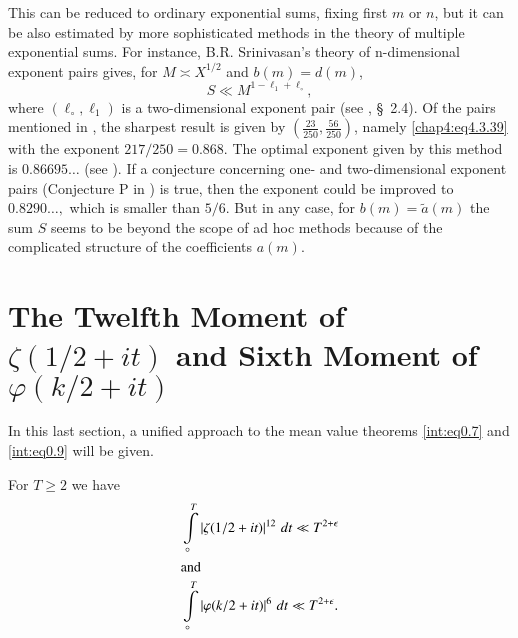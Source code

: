 This can be reduced to ordinary exponential sums, fixing first $m$ or
$n$, but it can be also estimated by more sophisticated methods in the
theory of multiple exponential sums. For instance, B.R. Srinivasan's
theory of n-dimensional exponent pairs gives, for $M\asymp X^{1/2}$
and $b(m)=d(m)$, 
\begin{equation}\label{chap4:eq4.3.39}
S\ll M^{1-\ell_1+\ell_\circ},
\end{equation}
where $(\ell_\circ,\ell_1)$ is a two-dimensional exponent pair (see
\cite{key13}, \S~2.4). Of the pairs mentioned in \cite{key13}, the
sharpest result is given by $(\frac{23}{250},\frac{56}{250})$, namely
\eqref{chap4:eq4.3.39} with the exponent $217/250=0.868$. The optimal
exponent given by this method is $0.86695\ldots$ (see
\cite{key10}). If a conjecture concerning one- and two-dimensional
exponent pairs (Conjecture P in \cite{key10}) is true, then the
exponent could be improved to $0.8290\ldots,$ which is smaller than
$5/6$. But in any case, for $b(m)=\tilde{a}(m)$ the sum $S$ seems to
be beyond the scope of ad hoc methods because of the complicated
structure of the coefficients $a(m)$.  

\section[The Twelth Moment of]{The Twelfth Moment of $\zeta(1/2+it)$
  and Sixth Moment of $\varphi(k /2+it)$}\label{chap4:sec4.4} 

In this last section, a unified approach to the mean value theorems
\ref{int:eq0.7} and \ref{int:eq0.9} will be given. 
\begin{thm}\label{chap4:thm4.7}
For $T\geq 2$ we have
\begin{align}
& \int\limits_\circ^T \left|\zeta(1/2+it)\right|^{12}\,dt\ll
  T^{2+\epsilon}\label{chap4:eq4.4.1}\\ 
\intertext{and}
& \int\limits_\circ^T \left|\varphi(k /2+it)\right|^6\,dt\ll
T^{2+\epsilon}.\label{chap4:eq4.4.2} 
\end{align}
\end{thm}

